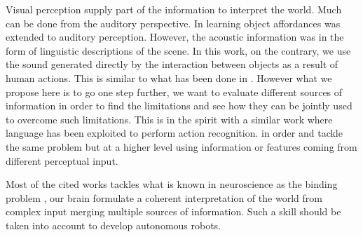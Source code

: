 Visual perception supply part of the information to interpret the world. Much can be done from the auditory perspective. In \cite{SalviEtAlAffSpeech2012} learning object affordances was extended to auditory perception. However, the acoustic information was in the form of linguistic descriptions of the scene. In this work, on the contrary, we use the sound generated directly by the interaction between objects as a result of human actions. This is similar to what has been done in \cite{Stork12}. However what we propose here is to go one step further, we want to evaluate different sources of information in order to find the limitations and see how they can be jointly used to overcome such limitations. This is in the spirit with a similar work \cite{TeoYDFA12} where language has been exploited to perform action recognition. in order and tackle the same problem but at a higher level using information or features coming from different perceptual input. 

Most of the cited works tackles what is known in neuroscience as the binding problem \cite{Treisman96}, our brain formulate a coherent interpretation of the world from complex input merging multiple sources of information. Such a skill should be taken into account to develop autonomous robots.












